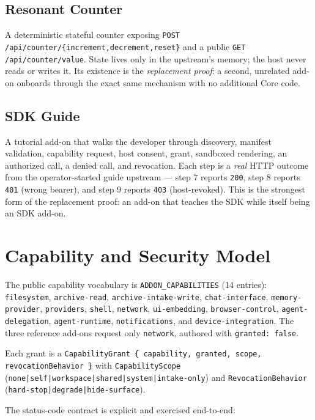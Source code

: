 \documentclass[11pt]{article}
\begin{document}
\subsection{Resonant Counter}

A deterministic stateful counter exposing \texttt{POST
/api/counter/\{increment,decrement,reset\}} and a public \texttt{GET
/api/counter/value}. State lives only in the upstream's memory; the host never
reads or writes it. Its existence is the \emph{replacement proof}: a second,
unrelated add-on onboards through the exact same mechanism with no additional
Core code.

\subsection{SDK Guide}

A tutorial add-on that walks the developer through discovery, manifest
validation, capability request, host consent, grant, sandboxed rendering, an
authorized call, a denied call, and revocation. Each step is a \emph{real} HTTP
outcome from the operator-started guide upstream --- step 7 reports \texttt{200},
step 8 reports \texttt{401} (wrong bearer), and step 9 reports \texttt{403}
(host-revoked). This is the strongest form of the replacement proof: an add-on
that teaches the SDK while itself being an SDK add-on.

\section{Capability and Security Model}

The public capability vocabulary is \texttt{ADDON\_CAPABILITIES} (14 entries):
\texttt{filesystem}, \texttt{archive-read}, \texttt{archive-intake-write},
\texttt{chat-interface}, \texttt{memory-provider}, \texttt{providers},
\texttt{shell}, \texttt{network}, \texttt{ui-embedding},
\texttt{browser-control}, \texttt{agent-delegation}, \texttt{agent-runtime},
\texttt{notifications}, and \texttt{device-integration}. The three reference
add-ons request only \texttt{network}, authored with \texttt{granted: false}.

Each grant is a \texttt{CapabilityGrant \{ capability, granted, scope,
revocationBehavior \}} with \texttt{CapabilityScope}
(\texttt{none|self|workspace|shared|system|intake-only}) and
\texttt{RevocationBehavior} (\texttt{hard-stop|degrade|hide-surface}).

The status-code contract is explicit and exercised end-to-end:
\end{document}

